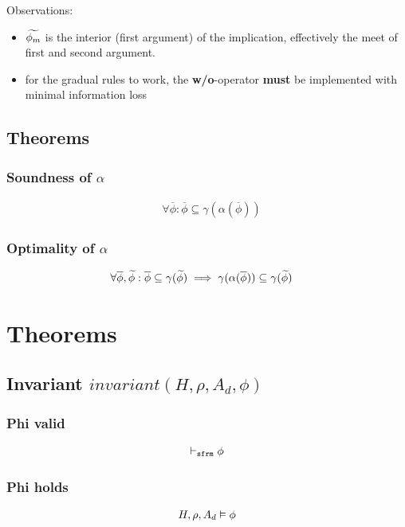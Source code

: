 \documentclass[11pt,a4paper]{article}
\begin{document}
Observations:
\begin{itemize}
\item $\widetilde{\phi_m}$ is the interior (first argument) of the implication, effectively the meet of first and second argument.
\item for the gradual rules to work, the \textbf{w/o}-operator \textbf{must} be implemented with minimal information loss
\end{itemize}


\subsection{Theorems}
\subsubsection{Soundness of $\alpha$}
\begin{align*}
&\forall \overline{\phi} : \overline{\phi} \subseteq \gamma(\alpha(\overline{\phi}))
\end{align*}
\subsubsection{Optimality of $\alpha$}
\begin{align*}
&\forall \overline{\phi}, \widetilde{\phi} : \overline{\phi} \subseteq \gamma(\widetilde{\phi}) \implies  \gamma(\alpha(\overline{\phi}))\subseteq
\gamma(\widetilde{\phi}) 
\end{align*}

\section{Theorems}
\subsection{Invariant $invariant(H, \rho, A_d, \phi)$}

\subsubsection{Phi valid}
\begin{align*}
    \vdash_\texttt{sfrm} {\phi}
\end{align*}

\subsubsection{Phi holds}
\begin{align*}
    H,\rho,A_d \vDash \phi
\end{align*}
\end{document}
